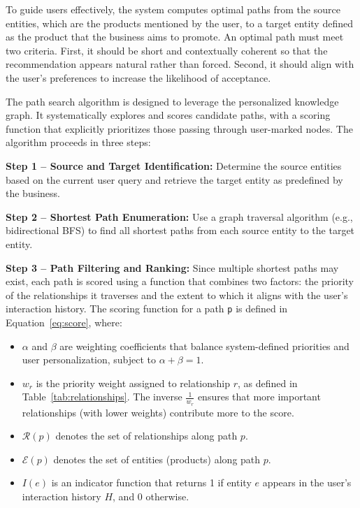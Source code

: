 To guide users effectively, the system computes optimal paths from the source entities, which are the products mentioned by the user, to a target entity defined as the product that the business aims to promote. An optimal path must meet two criteria. First, it should be short and contextually coherent so that the recommendation appears natural rather than forced. Second, it should align with the user’s preferences to increase the likelihood of acceptance.





The path search algorithm is designed to leverage the personalized knowledge graph. It systematically explores and scores candidate paths, with a scoring function that explicitly prioritizes those passing through user-marked nodes. The algorithm proceeds in three steps:

\textbf{Step 1 – Source and Target Identification:} Determine the source entities based on the current user query and retrieve the target entity as predefined by the business.

\textbf{Step 2 – Shortest Path Enumeration:} Use a graph traversal algorithm (e.g., bidirectional BFS) to find all shortest paths from each source entity to the target entity.

\textbf{Step 3 – Path Filtering and Ranking:} Since multiple shortest paths may exist, each path is scored using a function that combines two factors: the priority of the relationships it traverses and the extent to which it aligns with the user's interaction history. The scoring function for a path \texttt{p} is defined in Equation~\eqref{eq:score}, where:
\begin{itemize}
    \item $\alpha$ and $\beta$ are weighting coefficients that balance system-defined priorities and user personalization, subject to $\alpha + \beta = 1$.
    \item $w_r$ is the priority weight assigned to relationship $r$, as defined in Table~\ref{tab:relationships}. The inverse $\frac{1}{w_r}$ ensures that more important relationships (with lower weights) contribute more to the score.
    \item $\mathcal{R}(p)$ denotes the set of relationships along path $p$.
    \item $\mathcal{E}(p)$ denotes the set of entities (products) along path $p$.
    \item $I(e)$ is an indicator function that returns 1 if entity $e$ appears in the user's interaction history $H$, and 0 otherwise.
\end{itemize}

